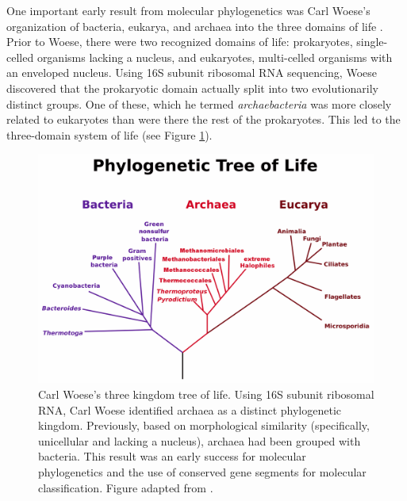 One important early result from molecular phylogenetics was Carl Woese's organization of bacteria, eukarya, and archaea into the three domains of life \cite{Woese:1977vd}.
Prior to Woese, there were two recognized domains of life: prokaryotes, single-celled organisms lacking a nucleus, and eukaryotes, multi-celled organisms with an enveloped nucleus.
Using 16S subunit ribosomal RNA sequencing, Woese discovered that the prokaryotic domain actually split into two evolutionarily distinct groups.
One of these, which he termed \emph{archaebacteria} was more closely related to eukaryotes than were there the rest of the prokaryotes.
This led to the three-domain system of life (see Figure \ref{fig:woese_tree}).

\begin{figure}
\centering
\includegraphics[width=.7\columnwidth]{./fig/introduction/woese_tree.png}
\caption[Carl Woese's Three Kingdom Tree of Life]{Carl Woese's three kingdom tree of life. Using 16S subunit ribosomal RNA, Carl Woese identified archaea as a distinct phylogenetic kingdom. Previously, based on morphological similarity (specifically, unicellular and lacking a nucleus), archaea had been grouped with bacteria. This result was an early success for molecular phylogenetics and the use of conserved gene segments for molecular classification. Figure adapted from \cite{Woese:1990uc}.}
\label{fig:woese_tree}
\end{figure}

